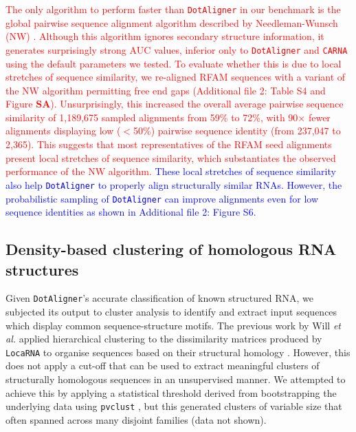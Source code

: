 \documentclass{bmcart}
\newcommand\dotaligner{\texttt{DotAligner}}
\newcommand\locarna{\texttt{LocaRNA}}
\newcommand\carna{\texttt{CARNA}}
\begin{document}
\textcolor{red} {The only algorithm to perform faster than \dotaligner{} in our benchmark is the global pairwise 
sequence alignment algorithm described by Needleman-Wunsch (NW) \cite{needleman1970general}. 
Although this algorithm ignores secondary structure information, it generates surprisingly strong
AUC values, inferior only to \dotaligner{} and \carna{} using the default parameters we tested.  
To evaluate whether this is due to local stretches of sequence similarity, we re-aligned RFAM 
sequences with a variant of the NW algorithm permitting free end gaps (Additional file 2: Table S4 
and Figure \textbf{SA}).  
Unsurprisingly, this increased the overall average pairwise sequence similarity of 1,189,675 sampled 
alignments from 59\% to 72\%, with 90$\times$ fewer alignments displaying low ($<$50\%) pairwise 
sequence identity (from 237,047 to 2,365). This suggests that most representatives of  the RFAM 
seed alignments present local stretches of sequence similarity, which substantiates 
the observed performance of the NW algorithm.}
\textcolor{blue} {These local stretches of sequence similarity also help
\dotaligner{} to properly align structurally similar RNAs. However, the
probabilistic sampling of \dotaligner{} can improve alignments even for low
sequence identities as shown in Additional file 2: Figure S6.} \\


\subsection*{Density-based clustering of homologous RNA structures}

Given \dotaligner{}'s accurate classification of known structured RNA, we subjected its
output to cluster analysis to identify and extract input sequences which display common
sequence-structure motifs. The previous work by Will \textit{et al.} applied hierarchical clustering 
to the dissimilarity matrices produced by \locarna{} to organise sequences based on their
structural homology \cite{Will17432929}. However, this does not apply a cut-off that can be used 
to extract meaningful clusters of structurally homologous sequences in an unsupervised 
manner. We attempted to achieve this by applying a statistical threshold derived from 
bootstrapping the underlying data using \texttt{pvclust} \cite{suzuki2006pvclust}, but this
generated clusters of variable size that often spanned across many disjoint families 
(data not shown).\\
\end{document}
